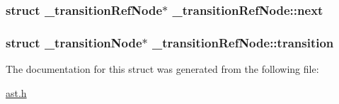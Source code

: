 \subsubsection[{\texorpdfstring{next}{next}}]{\setlength{\rightskip}{0pt plus 5cm}struct {\bf \+\_\+transition\+Ref\+Node}$\ast$ \+\_\+transition\+Ref\+Node\+::next}\hypertarget{struct__transitionRefNode_aba5a7e049f8e3970a99d03288499085f}{}\label{struct__transitionRefNode_aba5a7e049f8e3970a99d03288499085f}
\subsubsection[{\texorpdfstring{transition}{transition}}]{\setlength{\rightskip}{0pt plus 5cm}struct {\bf \+\_\+transition\+Node}$\ast$ \+\_\+transition\+Ref\+Node\+::transition}\hypertarget{struct__transitionRefNode_ab9614e396cf77178d67252922c643304}{}\label{struct__transitionRefNode_ab9614e396cf77178d67252922c643304}


The documentation for this struct was generated from the following file\+:\begin{DoxyCompactItemize}
\item 
\hyperlink{ast_8h}{ast.\+h}\end{DoxyCompactItemize}
